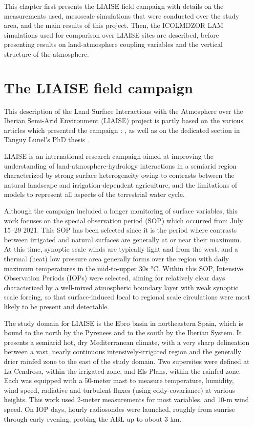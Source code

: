 This chapter first presents the LIAISE field campaign with details on the measurements used, mesoscale simulations that were conducted over the study area, and the main results of this project.
Then, the ICOLMDZOR LAM simulations used for comparison over LIAISE sites are described, before presenting results on land-atmosphere coupling variables and the vertical structure of the atmosphere.

\section{The LIAISE field campaign}
This description of the Land Surface Interactions with the Atmosphere over the Iberian Semi-Arid Environment (LIAISE) project is partly based on the various articles which presented the campaign : \citet{boone_land_2019,boone_updates_2021,boone_land_2025}, as well as on the dedicated section in Tanguy Lunel's PhD thesis \citep{lunel_interactions_2024}.

LIAISE is an international research campaign aimed at improving the understanding of land-atmosphere-hydrology interactions in a semiarid region characterized by strong surface heterogeneity owing to contrasts between the natural landscape and irrigation-dependent agriculture, and the limitations of models to represent all aspects of the terrestrial water cycle.

Although the campaign included a longer monitoring of surface variables, this work focuses on the special observation period (SOP) which occurred from July  15–29 2021. This SOP has been selected since it is the period where contrasts between irrigated and natural surfaces are generally at or near their maximum. At this time, synoptic scale winds are typically light and from the west, and a  thermal (heat) low pressure area generally forms over the region with daily maximum temperatures in the mid-to-upper  30s °C.
Within this SOP, Intensive Observation Periods (IOPs) were selected, aiming for relatively clear days characterized by a well-mixed  atmospheric boundary layer with weak synoptic scale forcing, so that surface-induced local to regional scale circulations were most likely to be present and detectable. 

The study domain for LIAISE is the Ebro basin in northeastern Spain, which is bound to the north by the Pyrenees and to the south by the Iberian System.
It presents a semiarid hot, dry  Mediterranean climate, with a very sharp delineation between a vast, nearly continuous intensively-irrigated region and the generally drier rainfed zone to the east of the study domain.
Two supersites were defined at La Cendrosa, within the irrigated zone, and Els Plans, within the rainfed zone. Each was equipped with a 50-meter mast to measure temperature, humidity, wind speed, radiative and turbulent fluxes (using eddy-covariance) at various heights.
This work used 2-meter measurements for most variables, and 10-m wind speed.
On IOP days, hourly radiosondes were launched, roughly from  sunrise through early evening, probing the ABL up to about 3 km.

